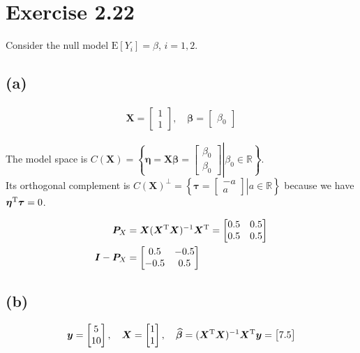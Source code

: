 \documentclass[a4paper]{article}
\newcommand{\E}{\mathrm{E}}
\begin{document}
\vspace{\baselineskip}
\section{Exercise 2.22}
Consider the null model $\E[Y_{i}] = \beta$, $i = 1, 2$.
\subsection{(a)}
\begin{align*}
\bm{X} = 
\begin{bmatrix}
1\\
1
\end{bmatrix}
, \quad
\bm{\beta} = 
\begin{bmatrix}
\beta_{0}
\end{bmatrix}
\end{align*}

The model space is $C(\bm{X}) = \left\{\bm{\eta} = \bm{X}\bm{\beta} =
\begin{bmatrix}
\beta_{0}\\
\beta_{0}
\end{bmatrix}
\left. \right\vert \beta_{0} \in \mathbb{R}
\right\}$.\\
Its orthogonal complement is
$C(\bm{X})^{\perp} = \left\{\bm{\tau} =
\begin{bmatrix}
-a\\
a
\end{bmatrix}
\left. \right\vert a \in \mathbb{R}
\right\}$ because we have $\bm{\eta}^{\rm T}\bm{\tau} = 0$.

\begin{align*}
\bm{P}_{X} &= \bm{X}(\bm{X}^{\rm T}\bm{X})^{-1}\bm{X}^{\rm T}
=
\begin{bmatrix}
0.5 & 0.5\\
0.5 & 0.5
\end{bmatrix}\\
\bm{I} - \bm{P}_{X} &= 
\begin{bmatrix}
0.5 & -0.5\\
-0.5 & 0.5
\end{bmatrix}
\end{align*}

\subsection{(b)}
\begin{align*}
\bm{y} =
\begin{bmatrix}
5\\
10
\end{bmatrix}
, \quad
\bm{X} = 
\begin{bmatrix}
1\\
1
\end{bmatrix}
, \quad
\widehat{\bm{\beta}} = (\bm{X}^{\rm T}\bm{X})^{-1}\bm{X}^{\rm T}\bm{y} = 
\begin{bmatrix}
7.5
\end{bmatrix}
\end{align*}
\end{document}
